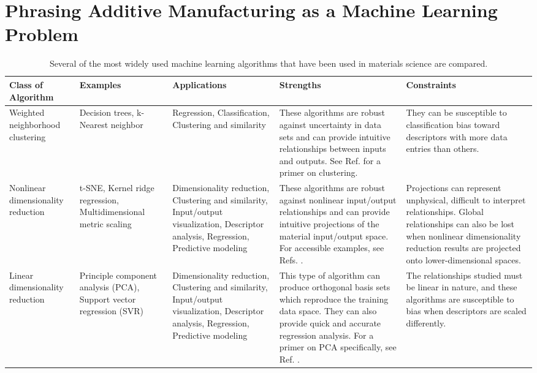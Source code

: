\section{Phrasing Additive Manufacturing as a Machine Learning Problem}\label{phrasing}






\begin{table*}
\caption{Several of the most widely used machine learning algorithms that have been used in materials science are compared.} \label{ML}
\begin{tabular}{p{2.25cm}|p{2.25cm}|p{3cm}|p{4cm}|p{4cm}}
\raggedright Class of Algorithm & Examples & Applications & Strengths & Constraints \\ \hline \hline
Weighted neighborhood clustering & Decision trees, k-Nearest neighbor & \raggedright Regression, Classification, Clustering and similarity & These algorithms are robust against uncertainty in data sets and can provide intuitive relationships between inputs and outputs. See Ref. \cite{Quinlan1986} for a primer on clustering. & They can be susceptible to classification bias toward descriptors with more data entries than others. \\ \hline

\raggedright Nonlinear dimensionality reduction & \raggedright t-SNE, Kernel ridge regression, Multidimensional metric scaling &\raggedright  Dimensionality reduction, Clustering and similarity, Input/output visualization, Descriptor analysis, Regression, Predictive modeling &\raggedright These algorithms are robust against nonlinear input/output relationships and can provide intuitive projections of the material input/output space. For accessible examples, see Refs. \cite{Tenenbaum2000, Roweis2000}. & Projections can represent unphysical, difficult to interpret relationships. Global relationships can also be lost when nonlinear dimensionality reduction results are projected onto lower-dimensional spaces.\\ \hline

\raggedright Linear dimensionality reduction & \raggedright Principle component analysis (PCA), Support vector regression (SVR) & Dimensionality reduction, Clustering and similarity, Input/output visualization, Descriptor analysis, Regression, Predictive modeling & \raggedright This type of algorithm can produce orthogonal basis sets which reproduce the training data space. They can also provide quick and accurate regression analysis. For a primer on PCA specifically, see Ref. \cite{Bro2014}. & The relationships studied must be linear in nature, and these algorithms are susceptible to bias when descriptors are scaled differently. \\ \hline


\end{tabular}
\end{table*}

